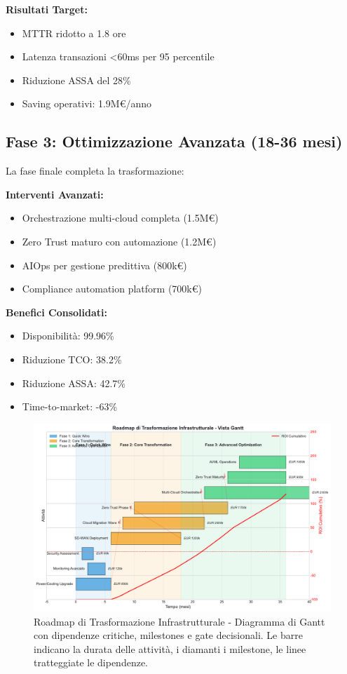 \textbf{Risultati Target:}
\begin{itemize}
    \item MTTR ridotto a 1.8 ore
    \item Latenza transazioni <60ms per 95 percentile
    \item Riduzione ASSA del 28\%
    \item Saving operativi: 1.9M€/anno
\end{itemize}

\subsection{\texorpdfstring{\textbf{Fase 3: Ottimizzazione Avanzata (18-36 mesi)}}{3.6.3 - Fase 3: Ottimizzazione Avanzata (18-36 mesi)}}

La fase finale completa la trasformazione:

\textbf{Interventi Avanzati:}
\begin{itemize}
    \item Orchestrazione multi-cloud completa (1.5M€)
    \item Zero Trust maturo con automazione (1.2M€)
    \item AIOps per gestione predittiva (800k€)
    \item Compliance automation platform (700k€)
\end{itemize}

\textbf{Benefici Consolidati:}
\begin{itemize}
    \item Disponibilità: 99.96\%
    \item Riduzione TCO: 38.2\%
    \item Riduzione ASSA: 42.7\%
    \item Time-to-market: -63\%
\end{itemize}

\begin{figure}[htbp]
\centering
\includegraphics[width=1\textwidth]{thesis_figures/cap3/figura_3_4_roadmap.pdf}
\caption{Roadmap di Trasformazione Infrastrutturale - Diagramma di Gantt con dipendenze critiche, milestones e gate decisionali. Le barre indicano la durata delle attività, i diamanti i milestone, le linee tratteggiate le dipendenze.}
\label{fig:roadmap_transformation}
\end{figure}

